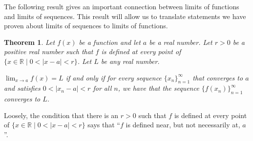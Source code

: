 \documentclass[12pt]{amsart}
\newcommand{\R}{{\mathbb{R}}}
\numberwithin{equation}{section}
\theoremstyle{plain} %
\newtheorem{thm}[equation]{Theorem}
\theoremstyle{definition}
\newtheorem{ex}[equation]{Example}
\theoremstyle{remark}
\begin{document}
	


The following result gives an important connection between limits of functions and limits of sequences. This result will allow us to translate
statements we have proven about limits of sequences to limits of functions.



\begin{thm} \label{lem228}
  Let $f(x)$ be a function and let $a$ be a real number.
  Let $r > 0$ be a positive real number such that
  $f$ is defined
  at every point of $\{x \in \R \mid 0 < |x-a| < r\}$.
    Let $L$ be any real number. 

$\lim_{x \to a} f(x) = L$ if and only if for every sequence 
$\{x_n\}_{n=1}^\infty$ that converges to $a$ and satisfies $0 < |x_n - a| < r$ for all $n$, we have that the sequence $\{f(x_n)\}_{n=1}^\infty$ converges to $L$. 
\end{thm}

 Loosely, the condition that there is an $r > 0$ such that 
$f$ is defined at every point of $\{x \in \R \mid 0 < |x-a| < r\}$ says that ``$f$ is defined near, but not necessarily at, $a$''. 






\end{document}
